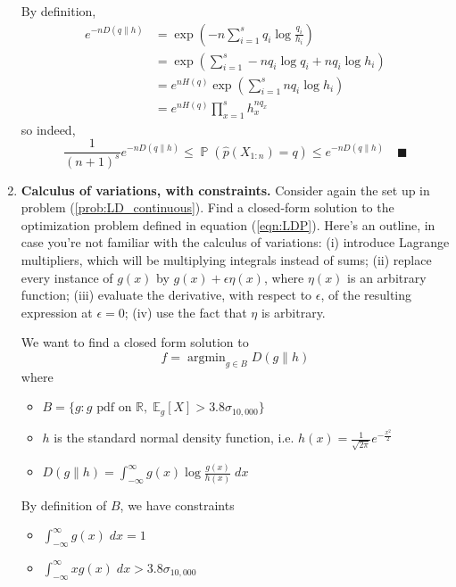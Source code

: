 \documentclass[12pt]{article}
\newcommand{\R}{\mathbb{R}}
\newcommand{\E}{\mathbb{E}}
\newcommand{\qed}{\quad \blacksquare}
\DeclareMathOperator{\Prob}{\mathbb{P}}
\DeclareMathOperator*{\argmin}{\arg\min}
\begin{document}
\begin{enumerate}[1.]
	      By definition,
	      \begin{align*}
		      e^{-nD(q\| h)} & = \exp(-n\sum_{i=1}^s q_i \log \frac{q_i}{h_i})         \\
		                     & = \exp(\sum_{i=1}^s -nq_i \log q_i + nq_i \log h_i)     \\
		                     & = e^{nH(q)} \exp\left(\sum_{i=1}^s nq_i \log h_i\right) \\
		                     & = e^{nH(q)} \prod_{x=1}^s h_x^{nq_x}
	      \end{align*}
	      so indeed,
	      \[ \frac{1}{(n+1)^s} e^{-nD(q\|h)} \leq \Prob(\widehat p(X_{1:n}) = q) \leq e^{-nD(q\|h)} \qed\]


	      \color{black}

	      \pagebreak


	\item{\bf Calculus of variations, with constraints.}
	      \label{prob:calc_variations}
	      Consider again the set up in problem (\ref{prob:LD_continuous}).
	      Find a closed-form solution to the optimization problem defined in equation (\ref{eqn:LDP}).
	      Here's an outline, in case you're not familiar with the calculus of variations: (i) introduce Lagrange multipliers, which will be multiplying integrals instead of sums; (ii) replace every instance of $g(x)$ by $g(x)+\epsilon\eta(x)$, where $\eta(x)$ is an arbitrary function;
	      (iii) evaluate the derivative, with respect to $\epsilon$, of the resulting expression at $\epsilon=0$; (iv) use the fact that $\eta$ is arbitrary.

	      \color{red}
	      We want to find a closed form solution to
	      \[f = \argmin_{g \in B} D(g \| h)\]
	      where
	      \begin{itemize}
		      \item $B = \{g: g \text{ pdf on } \R,\; \E_g[X] > 3.8\sigma_{10,000}\}$
		      \item $h$ is the standard normal density function, i.e. $h(x) = \frac{1}{\sqrt{2\pi}}e^{-\frac{x^2}{2}}$
		      \item $D(g \| h) = \int_{-\infty}^{\infty} g(x) \log \frac{g(x)}{h(x)}\; dx$
	      \end{itemize}

	      By definition of $B$, we have constraints
	      \begin{itemize}
		      \item $\int_{-\infty}^{\infty} g(x)\; dx = 1$
		      \item $\int_{-\infty}^{\infty} xg(x)\; dx > 3.8\sigma_{10,000}$
	      \end{itemize}


\end{enumerate}
\end{document}
